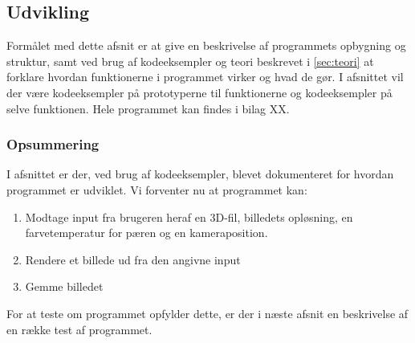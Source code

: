 \subsection{Udvikling}
Formålet med dette afsnit er at give en beskrivelse af programmets opbygning og struktur, samt ved brug af kodeeksempler og teori beskrevet i \ref{sec:teori} at forklare hvordan funktionerne i programmet virker og hvad de gør. I afsnittet vil der være kodeeksempler på prototyperne til funktionerne og kodeeksempler på selve funktionen. Hele programmet kan findes i bilag XX.







\subsubsection*{Opsummering}

I afsnittet er der, ved brug af kodeeksempler, blevet dokumenteret for hvordan programmet er udviklet. Vi forventer nu at programmet kan:

\begin{enumerate}
    \item Modtage input fra brugeren heraf en 3D-fil, billedets opløsning, en farvetemperatur for pæren og en kameraposition.
    \item Rendere et billede ud fra den angivne input
    \item Gemme billedet
\end{enumerate}

For at teste om programmet opfylder dette, er der i næste afsnit en beskrivelse af en række test af programmet.